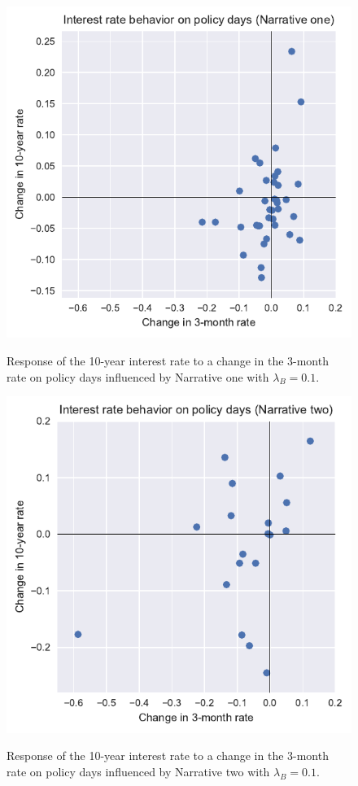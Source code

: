 \documentclass[11pt,a4paper,english,oneside]{book}
\numberwithin{equation}{chapter}
\begin{document}
\begin{figure}
	\caption{Response of the 10-year interest rate to a change in the 3-month rate on policy days influenced by Narrative one with $\lambda_B=0.1$.}
	\centering
	\includegraphics[scale=1]{Images/ChangePlot02_L0_1.pdf}
	\label{Change02_L01}
\end{figure}

\begin{figure}
	\caption{Response of the 10-year interest rate to a change in the 3-month rate on policy days influenced by Narrative two with $\lambda_B=0.1$.}
	\centering
	\includegraphics[scale=1]{Images/ChangePlot03_L0_1.pdf}
	\label{Change03_L01}
\end{figure}
\end{document}
